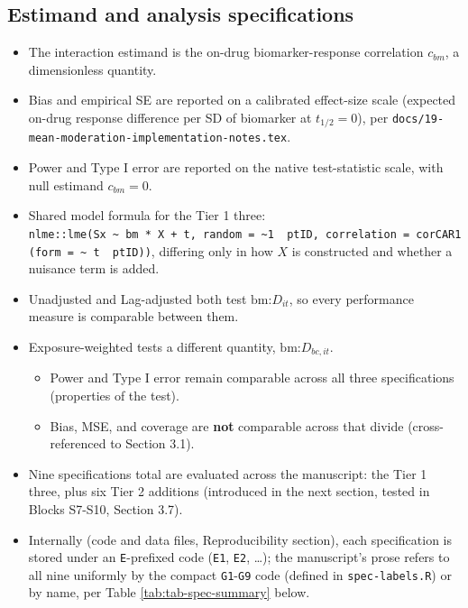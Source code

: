 \documentclass[
  11pt,
]{article}
\providecommand{\tightlist}{%
  \setlength{\itemsep}{0pt}\setlength{\parskip}{0pt}}
\begin{document}
\subsection{Estimand and analysis specifications}\label{estimand-and-analysis-specifications}

\begin{itemize}
\tightlist
\item
  The interaction estimand is the on-drug biomarker-response
  correlation \(c_{bm}\), a dimensionless quantity.
\item
  Bias and empirical SE are reported on a calibrated effect-size
  scale (expected on-drug response difference per SD of biomarker at
  \(t_{1/2}=0\)), per \texttt{docs/19-mean-moderation-implementation-notes.tex}.
\item
  Power and Type I error are reported on the native test-statistic
  scale, with null estimand \(c_{bm} = 0\).
\item
  Shared model formula for the Tier 1 three: \texttt{nlme::lme(Sx\ \textasciitilde{}\ bm\ *\ X\ +\ t,\ random\ =\ \textasciitilde{}1\ \textbar{}\ ptID,\ correlation\ =\ corCAR1(form\ =\ \textasciitilde{}\ t\ \textbar{}\ ptID))},
  differing only in how \(X\) is constructed and whether a nuisance
  term is added.
\item
  Unadjusted and Lag-adjusted both test \(\text{bm:}D_{it}\), so every
  performance measure is comparable between them.
\item
  Exposure-weighted tests a different quantity, \(\text{bm:}D_{bc,it}\).

  \begin{itemize}
  \tightlist
  \item
    Power and Type I error remain comparable across all three
    specifications (properties of the test).
  \item
    Bias, MSE, and coverage are \textbf{not} comparable across that
    divide (cross-referenced to Section 3.1).
  \end{itemize}
\item
  Nine specifications total are evaluated across the manuscript:
  the Tier 1 three, plus six Tier 2 additions (introduced in the next
  section, tested in Blocks S7-S10, Section 3.7).
\item
  Internally (code and data files, Reproducibility section), each
  specification is stored under an \texttt{E}-prefixed code (\texttt{E1}, \texttt{E2},
  \ldots); the manuscript's prose refers to all nine uniformly by the
  compact \texttt{G1}-\texttt{G9} code (defined in \texttt{spec-labels.R}) or by name, per
  Table \ref{tab:tab-spec-summary} below.
\end{itemize}
\end{document}
